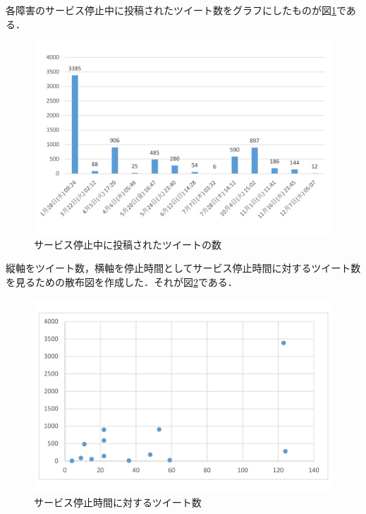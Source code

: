 \newpage
各障害のサービス停止中に投稿されたツイート数をグラフにしたものが図\ref{ツイート数}である．
\begin{figure}[htb]
\centering
\includegraphics[width=13cm]{img/graph2.pdf}
\caption{サービス停止中に投稿されたツイートの数}\label{ツイート数}
\end{figure}
\newpage
縦軸をツイート数，横軸を停止時間としてサービス停止時間に対するツイート数を見るための散布図を作成した．それが図\ref{散布図}である．
\begin{figure}[htb]
\centering
\includegraphics[width=13cm]{img/sample.pdf}
\caption{サービス停止時間に対するツイート数}\label{散布図}
\end{figure}

